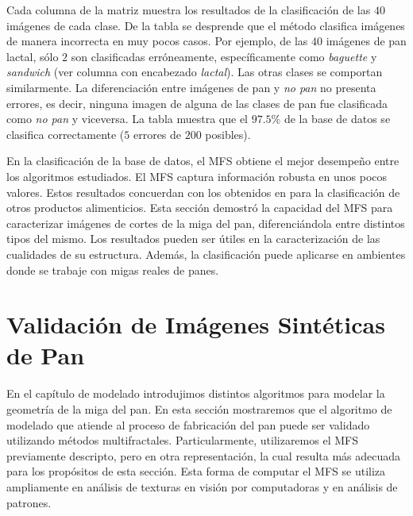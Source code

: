 Cada columna de la matriz muestra los resultados de la clasificación de las $40$ imágenes de cada clase.
De la tabla se desprende que el método clasifica imágenes de manera incorrecta en muy pocos casos.
Por ejemplo, de las $40$ imágenes de pan lactal, sólo $2$ son clasificadas erróneamente, específicamente como {\em baguette} y {\em sandwich} (ver columna con encabezado {\em lactal}).
Las otras clases se comportan similarmente.
La diferenciación entre imágenes de pan y {\em no pan} no presenta errores, es decir, ninguna imagen de alguna de las clases de pan fue clasificada como {\em no pan} y viceversa.
La tabla muestra que el $97.5\%$ de la base de datos se clasifica correctamente ($5$ errores de $200$ posibles).

En la clasificación de la base de datos, el MFS obtiene el mejor desempeño entre los algoritmos estudiados.
El MFS captura información robusta en unos pocos valores.
Estos resultados concuerdan con los obtenidos en \cite{Bosch2011} para la clasificación de otros productos alimenticios.
Esta sección demostró la capacidad del MFS para caracterizar imágenes de cortes de la miga del pan, diferenciándola entre distintos tipos del mismo.
Los resultados pueden ser útiles en la caracterización de las cualidades de su estructura.
Además, la clasificación puede aplicarse en ambientes donde se trabaje con migas reales de panes.



\section{Validación de Imágenes Sintéticas de Pan}

En el capítulo de modelado introdujimos distintos algoritmos para modelar la geometría de la miga del pan.
En esta sección mostraremos que el algoritmo de modelado que atiende al proceso de fabricación del pan puede ser validado utilizando métodos multifractales.
Particularmente, utilizaremos el MFS previamente descripto, pero en otra representación, la cual resulta más adecuada para los propósitos de esta sección.
Esta forma de computar el MFS se utiliza ampliamente en análisis de texturas en visión por computadoras y en análisis de patrones.

